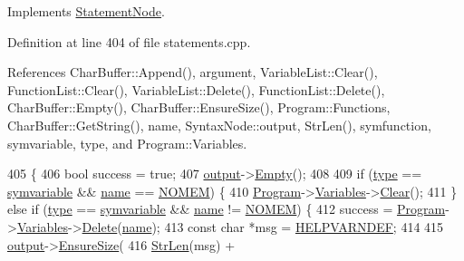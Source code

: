 Implements \hyperlink{classStatementNode_a721589622c930c010927b9a9c55b173e}{Statement\+Node}.



Definition at line 404 of file statements.\+cpp.



References Char\+Buffer\+::\+Append(), argument, Variable\+List\+::\+Clear(), Function\+List\+::\+Clear(), Variable\+List\+::\+Delete(), Function\+List\+::\+Delete(), Char\+Buffer\+::\+Empty(), Char\+Buffer\+::\+Ensure\+Size(), Program\+::\+Functions, Char\+Buffer\+::\+Get\+String(), name, Syntax\+Node\+::output, Str\+Len(), symfunction, symvariable, type, and Program\+::\+Variables.


\begin{DoxyCode}
405 \{
406     \textcolor{keywordtype}{bool} success = \textcolor{keyword}{true};
407     \hyperlink{classSyntaxNode_a1180628cbe3fce43930cee0df5a9ce5c}{output}->\hyperlink{classCharBuffer_abe39d3fd7d8b9c8ec343af2cae7adc96}{Empty}();
408 
409     \textcolor{keywordflow}{if} (\hyperlink{classDeleteStatement_a46629e67cd652c61ccabfc79c4cc8e01}{type} == \hyperlink{lex_8h_a7feef761cd73fac6e25b8bb80d2c4e54ae717993aa487e7090174437eb6239aec}{symvariable} && \hyperlink{classDeleteStatement_aec9706bae02a354afec8f639e283e5b9}{name} == \hyperlink{platform_8h_a46ff2bfbf0d44b8466a2251d5bd5e6f8}{NOMEM}) \{
410         \hyperlink{classProgram}{Program}->\hyperlink{classProgram_a1d4f53befb0270e64c91c24d14061188}{Variables}->\hyperlink{classVariableList_adef9da37cea5f80b9f2cdc899b3235c2}{Clear}();
411     \} \textcolor{keywordflow}{else} \textcolor{keywordflow}{if} (\hyperlink{classDeleteStatement_a46629e67cd652c61ccabfc79c4cc8e01}{type} == \hyperlink{lex_8h_a7feef761cd73fac6e25b8bb80d2c4e54ae717993aa487e7090174437eb6239aec}{symvariable} && \hyperlink{classDeleteStatement_aec9706bae02a354afec8f639e283e5b9}{name} != \hyperlink{platform_8h_a46ff2bfbf0d44b8466a2251d5bd5e6f8}{NOMEM}) \{
412         success = \hyperlink{classProgram}{Program}->\hyperlink{classProgram_a1d4f53befb0270e64c91c24d14061188}{Variables}->\hyperlink{classVariableList_a6f9e2f3a5cb1f8b4e71b0d8123e98264}{Delete}(\hyperlink{classDeleteStatement_aec9706bae02a354afec8f639e283e5b9}{name});
413         \textcolor{keyword}{const} \textcolor{keywordtype}{char} *msg = \hyperlink{text_8h_a9a06b887cb924e98bf181b08a517e072}{HELPVARNDEF};
414 
415         \hyperlink{classSyntaxNode_a1180628cbe3fce43930cee0df5a9ce5c}{output}->\hyperlink{classCharBuffer_ad1907009b5ad136692b989fa96bf2f7e}{EnsureSize}(
416             \hyperlink{clib_8h_a67ec56eb98b49515d35005a5b3bf9a32}{StrLen}(msg) +

\end{DoxyCode}

